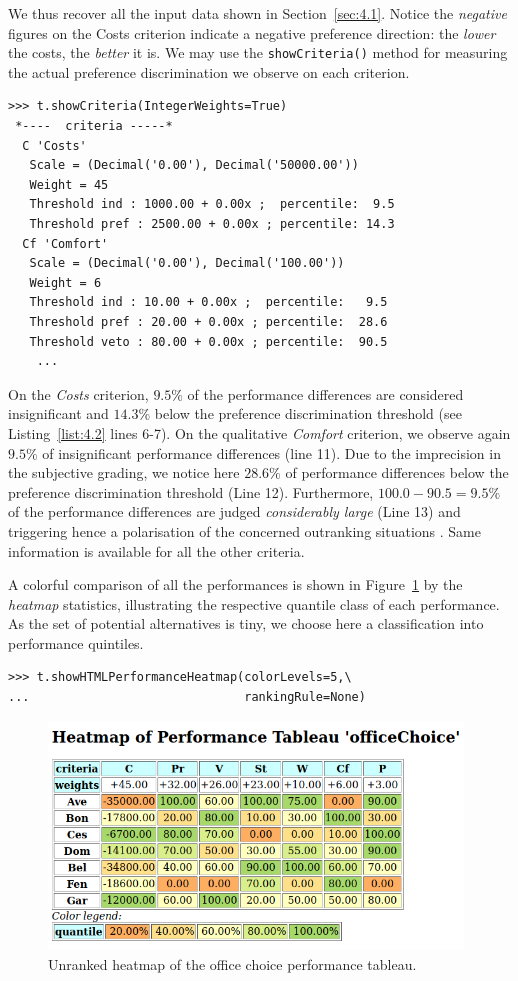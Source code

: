 We thus recover all the input data shown in Section~\ref{sec:4.1}. Notice the \emph{negative} figures on the Costs criterion indicate a negative preference direction: the \emph{lower} the costs, the \emph{better} it is. We may use the \texttt{showCriteria()} method for measuring the actual preference discrimination we observe on each criterion.
\begin{lstlisting}[caption={Inspecting the performance criteria.},label=list:4.2]
>>> t.showCriteria(IntegerWeights=True)
 *----  criteria -----*
  C 'Costs'
   Scale = (Decimal('0.00'), Decimal('50000.00'))
   Weight = 45
   Threshold ind : 1000.00 + 0.00x ;  percentile:  9.5
   Threshold pref : 2500.00 + 0.00x ; percentile: 14.3
  Cf 'Comfort'
   Scale = (Decimal('0.00'), Decimal('100.00'))
   Weight = 6
   Threshold ind : 10.00 + 0.00x ;  percentile:   9.5
   Threshold pref : 20.00 + 0.00x ; percentile:  28.6
   Threshold veto : 80.00 + 0.00x ; percentile:  90.5
    ...
\end{lstlisting}
On the \emph{Costs} criterion, $9.5\%$ of the performance differences are considered insignificant and $14.3\%$ below the preference discrimination threshold (see Listing~\ref{list:4.2} lines 6-7). On the qualitative \emph{Comfort} criterion, we observe again $9.5\%$ of insignificant performance differences (line 11). Due to the imprecision in the subjective grading, we notice here $28.6\%$ of performance differences below the preference discrimination threshold (Line 12). Furthermore, $100.0 - 90.5 = 9.5\%$ of the performance differences are judged \emph{considerably large} (Line 13) and triggering hence a polarisation of the concerned outranking situations \citep{BIS-2013}. Same information is available for all the other criteria. 
 
A colorful comparison of all the performances is shown in Figure~\ref{fig:4.1} by the \emph{heatmap} statistics, illustrating the respective quantile class of each performance. As the set of potential alternatives is tiny, we choose here a classification into performance quintiles.
\begin{lstlisting}
>>> t.showHTMLPerformanceHeatmap(colorLevels=5,\
...                              rankingRule=None)
\end{lstlisting}
    \begin{figure}[h]
\includegraphics[width=11cm]{Figures/officeChoiceHeatmap.png}
\caption{Unranked heatmap of the office choice performance tableau.}
\label{fig:4.1}       %
\end{figure}

